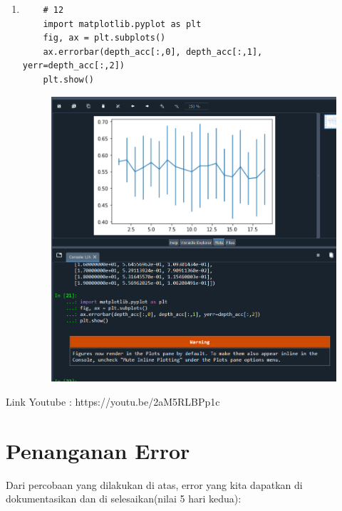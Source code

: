 \begin{enumerate}
\begin{figure}[!htbp]
\end{figure}
\item 
\begin{verbatim}
	# 12
	import matplotlib.pyplot as plt
	fig, ax = plt.subplots()
	ax.errorbar(depth_acc[:,0], depth_acc[:,1], yerr=depth_acc[:,2])
	plt.show()
\end{verbatim}
\begin{figure}[!htbp]
	\centering
	\includegraphics[scale=0.6]{figures/12.PNG}
\end{figure}
\newpage

\end{enumerate}
Link Youtube : https://youtu.be/2aM5RLBPp1c

\section{Penanganan Error}
Dari percobaan yang dilakukan di atas, error yang kita dapatkan di dokumentasikan dan di selesaikan(nilai 5 hari kedua):

